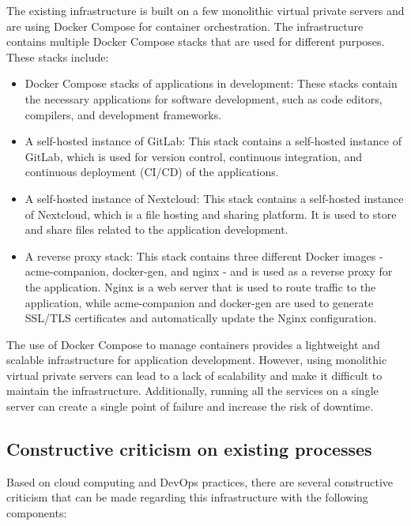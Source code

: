 The existing infrastructure is built on a few monolithic virtual private servers and are using Docker Compose for container orchestration. The infrastructure contains multiple Docker Compose stacks that are used for different purposes. These stacks include: 
\begin{itemize}[label={--}]
\item Docker Compose stacks of applications in development: These stacks contain the necessary applications for software development, such as code editors, compilers, and development frameworks. 

\item A self-hosted instance of GitLab: This stack contains a self-hosted instance of GitLab, which is used for version control, continuous integration, and continuous deployment (CI/CD) of the applications. 

\item A self-hosted instance of Nextcloud: This stack contains a self-hosted instance of Nextcloud, which is a file hosting and sharing platform. It is used to store and share files related to the application development. 

\item A reverse proxy stack: This stack contains three different Docker images - acme-companion, docker-gen, and nginx - and is used as a reverse proxy for the application. Nginx is a web server that is used to route traffic to the application, while acme-companion and docker-gen are used to generate SSL/TLS certificates and automatically update the Nginx configuration. 
\end{itemize}

The use of Docker Compose to manage containers provides a lightweight and scalable infrastructure for application development. However, using monolithic virtual private servers can lead to a lack of scalability and make it difficult to maintain the infrastructure. Additionally, running all the services on a single server can create a single point of failure and increase the risk of downtime. 

\subsection{Constructive criticism on existing processes} 

Based on cloud computing and DevOps practices, there are several constructive criticism that can be made regarding this infrastructure with the following components: 


